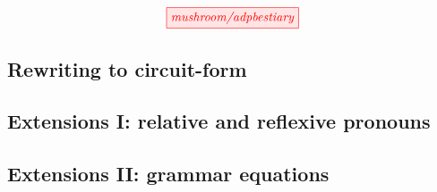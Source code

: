 \[
\tikzfig{mushroom/adpbestiary}
\]

\subsection{Rewriting to circuit-form}



\begin{example}

\end{example}

\subsection{Extensions I: relative and reflexive pronouns}


\begin{example}

\end{example}


\begin{example}

\end{example}


\begin{example}

\end{example}

\subsection{Extensions II: grammar equations}


\begin{example}

\end{example}


\begin{example}

\end{example}


\begin{example}

\end{example}

